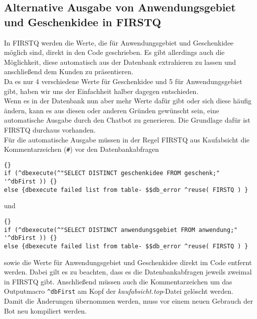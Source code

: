 \subsection{Alternative Ausgabe von Anwendungsgebiet und Geschenkidee in FIRSTQ}
\label{sec:Alternative}
In FIRSTQ werden die Werte, die für Anwendungsgebiet und Geschenkidee möglich sind, direkt in den Code geschrieben. Es gibt allerdings auch die Möglichkeit, diese automatisch aus der Datenbank extrahieren zu lassen und anschließend dem Kunden zu präsentieren.\\
Da es nur 4 verschiedene Werte für Geschenkidee und 5 für Anwendungsgebiet gibt, haben wir uns der Einfachheit halber dagegen entschieden.\\
Wenn es in der Datenbank nun aber mehr Werte dafür gibt oder sich diese häufig ändern, kann es aus diesen oder anderen Gründen gewünscht sein, eine automatische Ausgabe durch den Chatbot zu generieren. Die Grundlage dafür ist FIRSTQ durchaus vorhanden.\\
Für die automatische Ausgabe müssen in der Regel FIRSTQ aus Kaufabsicht die Kommentarzeichen (\lstinline|#|) vor den Datenbankabfragen
\begin{lstlisting}{}
if (^dbexecute(^"SELECT DISTINCT geschenkidee FROM geschenk;" '^dbFirst )) {}
else {dbexecute failed list from table- $$db_error ^reuse( FIRSTQ ) }
\end{lstlisting}
und
\begin{lstlisting}{}
if (^dbexecute(^"SELECT DISTINCT anwendungsgebiet FROM anwendung;" '^dbFirst )) {}
else {dbexecute failed list from table- $$db_error ^reuse( FIRSTQ ) }
\end{lstlisting}
sowie die Werte für Anwendungsgebiet und Geschenkidee direkt im Code entfernt werden. Dabei gilt es zu beachten, dass es die Datenbankabfragen jeweils zweimal in FIRSTQ gibt. Anschließend müssen auch die Kommentarzeichen um das Outputmacro \lstinline|^dbFirst| am Kopf der \textit{kaufabsicht.top}-Datei gelöscht werden.\\
Damit die Änderungen übernommen werden, muss vor einem neuen Gebrauch der Bot neu kompiliert werden.





